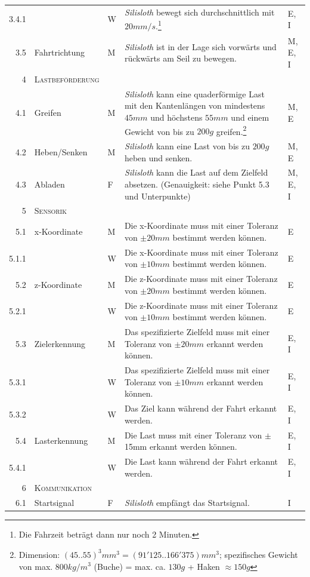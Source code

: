 \documentclass[a4paper,11pt]{scrartcl}
\begin{document}
\begin{longtable}{|r|l|l|p{7cm}|l|}
3.4.1 & & W & \textit{Silisloth} bewegt sich durchschnittlich mit $20mm/s$.\footnote{Die Fahrzeit beträgt dann nur noch 2 Minuten.} & E, I \\
3.5 & Fahrtrichtung & M & \textit{Silisloth} ist in der Lage sich vorwärts und rückwärts am Seil zu bewegen. & M, E, I \\
\textsc{4} & \textsc{Lastbeförderung} & & & \\
4.1 & Greifen & M & \textit{Silisloth} kann eine quaderförmige Last mit den Kantenlängen von mindestens $45mm$ und höchstens $55mm$ und einem Gewicht von bis zu $200g$ greifen.\footnote{Dimension: $(45..55)^{3}mm^{3}=(91'125..166'375)mm^{3}$; spezifisches Gewicht von max. $800kg/m^{3}$ (Buche) = max. ca. $130g$ + Haken $\approx 150g$} & M, E \\
4.2 & Heben/Senken & M & \textit{Silisloth} kann eine Last von bis zu $200g$ heben und senken. & M, E \\
4.3 & Abladen & F & \textit{Silisloth} kann die Last auf dem Zielfeld absetzen. (Genauigkeit: siehe Punkt 5.3 und Unterpunkte) & M, E, I \\
\textsc{5} & \textsc{Sensorik} & & &  \\
5.1 & x-Koordinate & M & Die x-Koordinate muss mit einer Toleranz von $\pm20mm$ bestimmt werden können. & E \\
5.1.1 & & W & Die x-Koordinate muss mit einer Toleranz von $\pm10mm$ bestimmt werden können. & E \\
5.2 & z-Koordinate & M & Die z-Koordinate muss mit einer Toleranz von $\pm20mm$ bestimmt werden können. & E \\
5.2.1 & & W & Die z-Koordinate muss mit einer Toleranz von $\pm10mm$ bestimmt werden können. & E \\
5.3 & Zielerkennung & M & Das spezifizierte Zielfeld muss mit einer Toleranz von $\pm20mm$ erkannt werden können. & E, I \\
5.3.1 & & W & Das spezifizierte Zielfeld muss mit einer Toleranz von $\pm10mm$ erkannt werden können. & E, I \\
5.3.2 & & W & Das Ziel kann während der Fahrt erkannt werden. & E, I \\
5.4 & Lasterkennung & M & Die Last muss mit einer Toleranz von $\pm$15mm erkannt werden können. & E, I \\
5.4.1 & & W & Die Last kann während der Fahrt erkannt werden. & E, I \\
\textsc{6} & \textsc{Kommunikation} & & & \\
6.1 & Startsignal & F & \textit{Silisloth} empfängt das Startsignal. & I \\

\end{longtable}
\end{document}
